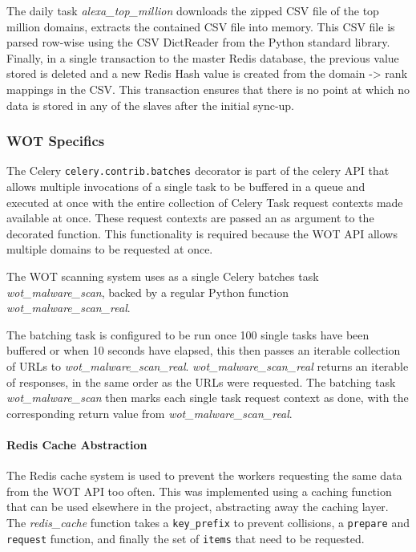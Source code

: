 The daily task \emph{alexa\_top\_million} downloads the zipped CSV file of the top million domains, extracts the contained CSV file into memory. This CSV file is parsed row-wise using the CSV DictReader from the Python standard library. Finally, in a single transaction to the master Redis database, the previous value stored is deleted and a new Redis Hash value is created from the domain -> rank mappings in the CSV. This transaction ensures that there is no point at which no data is stored in any of the slaves after the initial sync-up.

\subsubsection{WOT Specifics}
The Celery \verb`celery.contrib.batches` decorator is part of the celery API that allows multiple invocations of a single task to be buffered in a queue and executed at once with the entire collection of Celery Task request contexts made available at once. These request contexts are passed an as argument to the decorated function. This functionality is required because the WOT API allows multiple domains to be requested at once.

The WOT scanning system uses as a single Celery batches task \emph{wot\_malware\_scan}, backed by a regular Python function \emph{wot\_malware\_scan\_real}.

The batching task is configured to be run once 100 single tasks have been buffered or when 10 seconds have elapsed, this then passes an iterable collection of URLs to \emph{wot\_malware\_scan\_real}. \emph{wot\_malware\_scan\_real} returns an iterable of responses, in the same order as the URLs were requested. The batching task \emph{wot\_malware\_scan} then marks each single task request context as done, with the corresponding return value from \emph{wot\_malware\_scan\_real}\cite{celery-batches}.

\paragraph{Redis Cache Abstraction}
The Redis cache system is used to prevent the workers requesting the same data from the WOT API too often.  This was implemented using a caching function that can be used elsewhere in the project, abstracting away the caching layer.  The \emph{redis\_cache} function takes a \verb`key_prefix` to prevent collisions, a \verb`prepare` and \verb`request` function, and finally the set of \verb`items` that need to be requested.

